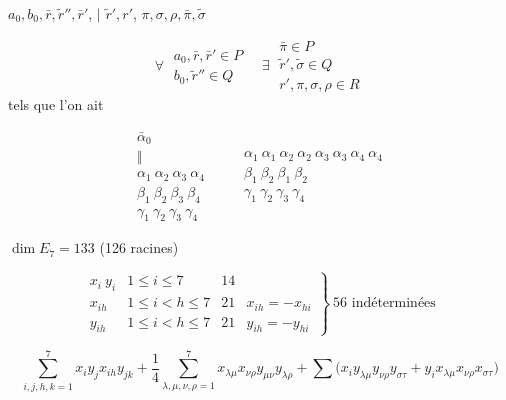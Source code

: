\documentclass[11pt,a4paper]{article}
\begin{document}
$a_0, b_0, \bar r, \tilde r'', \bar r'$, \struck{\ill{}} \quad $\Big|$ \quad
$\tilde r', r'$, $\pi, \sigma, \rho, \bar\pi, \tilde\sigma$

\[
\forall\;
\begin{array}{l}
a_0, \bar r, \bar r' \in P \\
b_0, \tilde r'' \in Q
\end{array}
\quad
\exists\;
\begin{array}{l}
\bar\pi \in P \\
\tilde r', \tilde\sigma \in Q \\
r', \pi, \sigma, \rho \in R
\end{array}
\]
tels que l'on ait

\[
\begin{array}{l}
\bar\alpha_0 \\
\Vert \\
\alpha_1\ \alpha_2\ \alpha_3\ \alpha_4 \\
\beta_1\ \beta_2\ \beta_3\ \beta_4 \\
\gamma_1\ \gamma_2\ \gamma_3\ \gamma_4
\end{array}
\qquad
\begin{array}{l}
\alpha_1\ \alpha_1\ \alpha_2\ \alpha_2\ \alpha_3\ \alpha_3\ \alpha_4\ \alpha_4 \\
\beta_1\ \beta_2\ \beta_1\ \beta_2 \\
\gamma_1\ \gamma_2\ \gamma_3\ \gamma_4
\end{array}
\]

$\dim E_7 = 133$ (126 racines)

\[
\left.
\begin{array}{llll}
x_i\ y_i & 1 \leq i \leq 7 & 14 & \\
x_{ih} & 1 \leq i < h \leq 7 & 21 & x_{ih} = -x_{hi} \\
y_{ih} & 1 \leq i < h \leq 7 & 21 & y_{ih} = -y_{hi}
\end{array}
\right\rbrace
\ 56 \text{ indéterminées}
\]

\[
\sum_{i,j,h,k=1}^{7} x_i y_j x_{ih} y_{jk}
+ \frac{1}{4} \sum_{\lambda,\mu,\nu,\rho=1}^{7} x_{\lambda\mu} x_{\nu\rho} y_{\mu\nu} y_{\lambda\rho}
+ \sum \bigl( x_i y_{\lambda\mu} y_{\nu\rho} y_{\sigma\tau}
+ y_i x_{\lambda\mu} x_{\nu\rho} x_{\sigma\tau} \bigr)
\]
\end{document}
